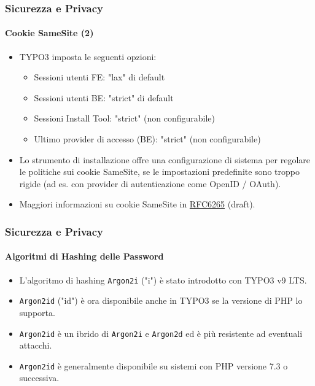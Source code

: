 
\begin{frame}[fragile]
	\frametitle{Sicurezza e Privacy}
	\framesubtitle{Cookie SameSite (2)}

	\begin{itemize}
		\item TYPO3 imposta le seguenti opzioni:

			\begin{itemize}\small
				\item Sessioni utenti FE: "lax" di default
				\item Sessioni utenti BE: "strict" di default
				\item Sessioni Install Tool: "strict" (non configurabile)
				\item Ultimo provider di accesso (BE): "strict" (non configurabile)
			\end{itemize}\normalsize

		\item Lo strumento di installazione offre una configurazione di sistema per
		    regolare le politiche sui cookie SameSite, se le impostazioni predefinite sono troppo rigide
			(ad es. con provider di autenticazione come OpenID / OAuth).

		\item Maggiori informazioni su cookie SameSite in
			\href{https://tools.ietf.org/html/draft-ietf-httpbis-cookie-same-site-00}{RFC6265} (draft).
	\end{itemize}

\end{frame}


\begin{frame}[fragile]
	\frametitle{Sicurezza e Privacy}
	\framesubtitle{Algoritmi di Hashing delle Password}

	\begin{itemize}
		\item L'algoritmo di hashing \texttt{Argon2i} ("i") è stato introdotto con TYPO3 v9 LTS.
		\item \texttt{Argon2id} ("id") è ora disponibile anche in TYPO3 se la versione di PHP lo supporta.
		\item \texttt{Argon2id} è un ibrido di \texttt{Argon2i} e \texttt{Argon2d}
			ed è più resistente ad eventuali  attacchi.
		\item \texttt{Argon2id} è generalmente disponibile su sistemi con PHP versione 7.3 o successiva.
	\end{itemize}

\end{frame}

